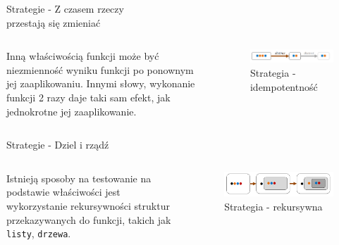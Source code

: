 \begin{frame}{Strategie - Z czasem rzeczy\\przestają się zmieniać}
    \begin{columns}[t]
            Inną właściwością funkcji może być niezmienność wyniku funkcji po ponownym jej zaaplikowaniu. 
            Innymi słowy, wykonanie funkcji 2 razy daje taki sam efekt, jak jednokrotne jej zaaplikowanie.
        \centering
        \begin{figure}
            \centering
            \includegraphics[width=1\textwidth]{images/property_idempotence.png}
            \caption{Strategia - idempotentność}
            \label{fig:independance_strategy}
        \end{figure}    
    \end{columns}
\end{frame}


\begin{frame}[fragile]{Strategie - Dziel i rządź}
    \begin{columns}[t]
            Istnieją sposoby na testowanie na podstawie właściwości jest wykorzystanie rekursywności struktur przekazywanych do funkcji, takich jak \texttt{listy}, \texttt{drzewa}. 
            \centering
            \begin{figure}
                \centering
                \includegraphics[width=1\textwidth]{images/property_induction.png}
                \caption{Strategia - rekursywna}
                \label{fig:recursive_strategy}
            \end{figure}    
    \end{columns}
\end{frame}

